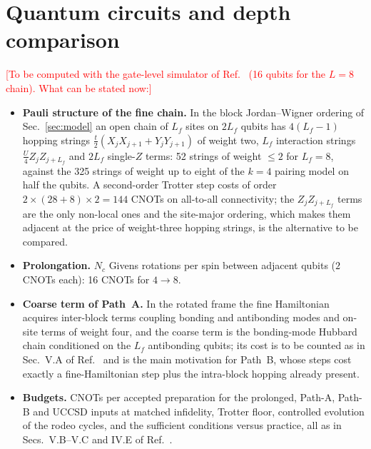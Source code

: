 \documentclass[
  aps,
  prc,
  reprint,
  superscriptaddress,
  floatfix,
  nofootinbib
]{revtex4-2}
\newcommand{\todo}[1]{\textcolor{red}{[#1]}}
\begin{document}
\section{Quantum circuits and depth comparison}
\label{sec:circuits}
\todo{To be computed with the gate-level simulator of
Ref.~\cite{EigenQPairing2026} (16 qubits for the $L=8$ chain).  What can be
stated now:}
\begin{itemize}
  \item \textbf{Pauli structure of the fine chain.}  In the block
  Jordan--Wigner ordering of Sec.~\ref{sec:model} an open chain of $L_f$
  sites on $2L_f$ qubits has $4(L_f-1)$ hopping strings
  $\tfrac t2(X_jX_{j+1}+Y_jY_{j+1})$ of weight two, $L_f$ interaction strings
  $\tfrac U4Z_jZ_{j+L_f}$ and $2L_f$ single-$Z$ terms: 52 strings of weight
  $\le2$ for $L_f=8$, against the 325 strings of weight up to eight of the
  $k=4$ pairing model on half the qubits.  A second-order Trotter step costs
  of order $2\times(28+8)\times2=144$ CNOTs on all-to-all connectivity; the
  $Z_jZ_{j+L_f}$ terms are the only non-local ones and the site-major
  ordering, which makes them adjacent at the price of weight-three hopping
  strings, is the alternative to be compared.
  \item \textbf{Prolongation.}  $N_c$ Givens rotations per spin between
  adjacent qubits ($2$ CNOTs each): 16 CNOTs for $4\to8$.
  \item \textbf{Coarse term of Path~A.}  In the rotated frame the fine
  Hamiltonian acquires inter-block terms coupling bonding and antibonding
  modes and on-site terms of weight four, and the coarse term is the
  bonding-mode Hubbard chain conditioned on the $L_f$ antibonding qubits;
  its cost is to be counted as in Sec.~V.A of
  Ref.~\cite{EigenQPairing2026} and is the main motivation for Path~B,
  whose steps cost exactly a fine-Hamiltonian step plus the intra-block
  hopping already present.
  \item \textbf{Budgets.}  CNOTs per accepted preparation for the prolonged,
  Path-A, Path-B and UCCSD inputs at matched infidelity, Trotter floor,
  controlled evolution of the rodeo cycles, and the sufficient conditions
  versus practice, all as in Secs.~V.B--V.C and IV.E of
  Ref.~\cite{EigenQPairing2026}.
\end{itemize}

\end{document}
